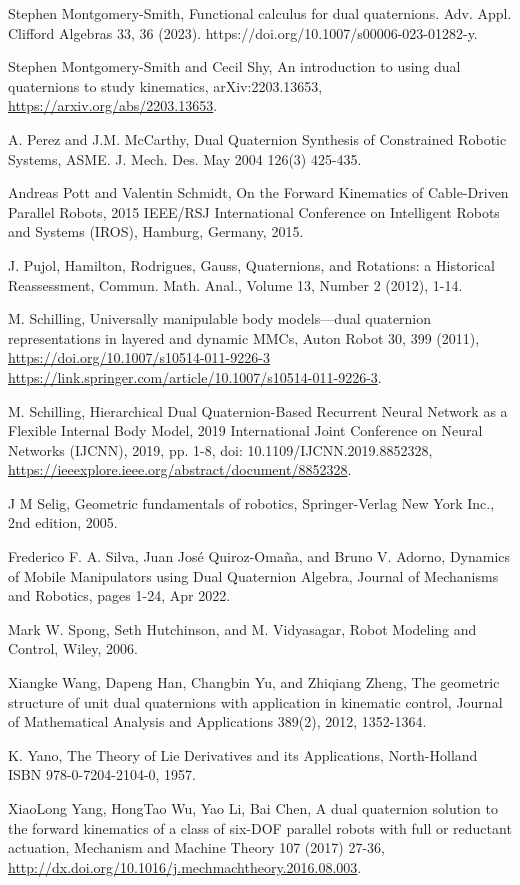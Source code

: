 \documentclass[reqno,12pt]{amsart}
\begin{document}
\begin{thebibliography}{99}
 Stephen Montgomery-Smith, Functional calculus for dual quaternions. Adv. Appl. Clifford Algebras 33, 36 (2023). https://doi.org/10.1007/s00006-023-01282-y.

 Stephen Montgomery-Smith and Cecil Shy, An introduction to using dual quaternions to study kinematics, arXiv:2203.13653, \url{https://arxiv.org/abs/2203.13653}.

 A. Perez and J.M. McCarthy, Dual Quaternion Synthesis of Constrained Robotic Systems, ASME. J. Mech. Des. May 2004 126(3) 425-435.

 Andreas Pott and Valentin Schmidt, On the Forward Kinematics of Cable-Driven Parallel Robots, 2015 IEEE/RSJ International Conference on Intelligent Robots and Systems (IROS), Hamburg, Germany, 2015.

 J. Pujol, Hamilton, Rodrigues, Gauss, Quaternions, and Rotations: a Historical Reassessment, Commun. Math. Anal., Volume 13, Number 2 (2012), 1-14.

  M. Schilling, Universally manipulable body models---dual quaternion representations in layered and dynamic MMCs, Auton Robot 30, 399 (2011), \url{https://doi.org/10.1007/s10514-011-9226-3 https://link.springer.com/article/10.1007/s10514-011-9226-3}.

 M. Schilling, Hierarchical Dual Quaternion-Based Recurrent Neural Network as a Flexible Internal Body Model, 2019 International Joint Conference on Neural Networks (IJCNN), 2019, pp. 1-8, doi: 10.1109/IJCNN.2019.8852328, \url{https://ieeexplore.ieee.org/abstract/document/8852328}.

 J M Selig, Geometric fundamentals of robotics, Springer-Verlag New York Inc., 2nd edition, 2005.

 Frederico F. A. Silva, Juan Jos\'e Quiroz-Oma\~na, and Bruno V. Adorno, Dynamics of Mobile Manipulators using Dual Quaternion Algebra, Journal of Mechanisms and Robotics, pages 1-24, Apr 2022.

 Mark W. Spong, Seth Hutchinson, and M. Vidyasagar, Robot Modeling and Control, Wiley, 2006.

 Xiangke Wang, Dapeng Han, Changbin Yu, and Zhiqiang Zheng, The geometric structure of unit dual quaternions with application in kinematic control, Journal of Mathematical Analysis and Applications 389(2), 2012, 1352-1364.

 K. Yano, The Theory of Lie Derivatives and its Applications, North-Holland ISBN 978-0-7204-2104-0, 1957.

 XiaoLong Yang, HongTao Wu, Yao Li, Bai Chen, A dual quaternion solution to the forward kinematics of a class of six-DOF parallel robots with full or reductant actuation, Mechanism and Machine Theory 107 (2017) 27-36, \url{http://dx.doi.org/10.1016/j.mechmachtheory.2016.08.003}.

\end{thebibliography}
\end{document}
